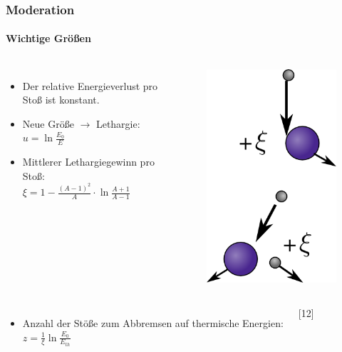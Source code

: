 \documentclass{beamer}[9pt]
\begin{document}
\begin{frame}
\frametitle{Moderation}
\framesubtitle{Wichtige Größen}



\begin{columns}
\begin{itemize}
\item Der relative Energieverlust pro Stoß ist konstant.
\item Neue Größe $\rightarrow$ Lethargie:\\
\vspace{0.5em}
$
u = \ln{\frac {E_0}{ E}}
$
\item Mittlerer Lethargiegewinn pro Stoß:\\
\vspace{0.5em}
$
\xi =1- \frac{(A-1)^2}{A} \cdot \ln{\frac{A+1}{A-1}}
$

\end{itemize}
\begin{figure}

\includegraphics[scale=.3]{moderator.png}

\end{figure}

\end{columns}

\begin{columns}
\begin{itemize}

\item Anzahl der Stöße zum Abbremsen auf thermische Energien:\\\vspace{0.5em}
$
z = \frac{1}{\xi}\ln{\frac{E_0}{E_{th}}}
$
\end{itemize}
\hspace{.5\columnwidth}[12]
\end{columns}
\end{frame}
\end{document}
